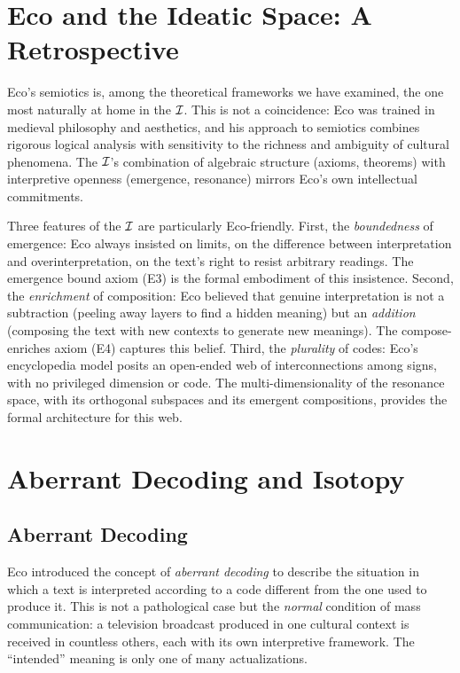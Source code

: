 \section{Eco and the Ideatic Space: A Retrospective}

Eco's semiotics is, among the theoretical frameworks we have examined,
the one most naturally at home in the $\mathcal{I}$. This is not a coincidence:
Eco was trained in medieval philosophy and aesthetics, and his approach
to semiotics combines rigorous logical analysis with sensitivity to
the richness and ambiguity of cultural phenomena. The $\mathcal{I}$'s combination
of algebraic structure (axioms, theorems) with interpretive openness
(emergence, resonance) mirrors Eco's own intellectual commitments.

Three features of the $\mathcal{I}$ are particularly Eco-friendly. First, the
\emph{boundedness} of emergence: Eco always insisted on limits, on the
difference between interpretation and overinterpretation, on the
text's right to resist arbitrary readings. The emergence bound axiom
(E3) is the formal embodiment of this insistence. Second, the
\emph{enrichment} of composition: Eco believed that genuine
interpretation is not a subtraction (peeling away layers to find a
hidden meaning) but an \emph{addition} (composing the text with new
contexts to generate new meanings). The compose-enriches axiom (E4)
captures this belief. Third, the \emph{plurality} of codes: Eco's
encyclopedia model posits an open-ended web of interconnections among
signs, with no privileged dimension or code. The multi-dimensionality
of the resonance space, with its orthogonal subspaces and its emergent
compositions, provides the formal architecture for this web.

\section{Aberrant Decoding and Isotopy}

\subsection{Aberrant Decoding}

Eco introduced the concept of \emph{aberrant decoding} to describe
the situation in which a text is interpreted according to a code
different from the one used to produce it. This is not a pathological
case but the \emph{normal} condition of mass communication: a
television broadcast produced in one cultural context is received in
countless others, each with its own interpretive framework. The
``intended'' meaning is only one of many actualizations.

